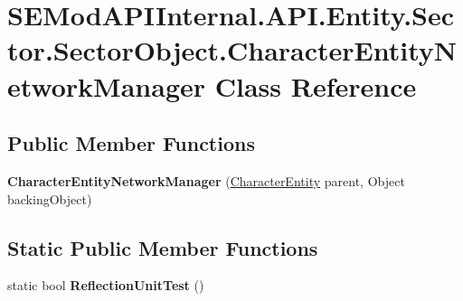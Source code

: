 \hypertarget{class_s_e_mod_a_p_i_internal_1_1_a_p_i_1_1_entity_1_1_sector_1_1_sector_object_1_1_character_entity_network_manager}{}\section{S\+E\+Mod\+A\+P\+I\+Internal.\+A\+P\+I.\+Entity.\+Sector.\+Sector\+Object.\+Character\+Entity\+Network\+Manager Class Reference}
\label{class_s_e_mod_a_p_i_internal_1_1_a_p_i_1_1_entity_1_1_sector_1_1_sector_object_1_1_character_entity_network_manager}
\subsection*{Public Member Functions}
\begin{DoxyCompactItemize}
\item 
\hypertarget{class_s_e_mod_a_p_i_internal_1_1_a_p_i_1_1_entity_1_1_sector_1_1_sector_object_1_1_character_entity_network_manager_aca87726f10c789899a7e62e7f157b1b6}{}{\bfseries Character\+Entity\+Network\+Manager} (\hyperlink{class_s_e_mod_a_p_i_internal_1_1_a_p_i_1_1_entity_1_1_sector_1_1_sector_object_1_1_character_entity}{Character\+Entity} parent, Object backing\+Object)\label{class_s_e_mod_a_p_i_internal_1_1_a_p_i_1_1_entity_1_1_sector_1_1_sector_object_1_1_character_entity_network_manager_aca87726f10c789899a7e62e7f157b1b6}

\end{DoxyCompactItemize}
\subsection*{Static Public Member Functions}
\begin{DoxyCompactItemize}
\item 
\hypertarget{class_s_e_mod_a_p_i_internal_1_1_a_p_i_1_1_entity_1_1_sector_1_1_sector_object_1_1_character_entity_network_manager_aaa68043ebbaeb18e72853cf987db302a}{}static bool {\bfseries Reflection\+Unit\+Test} ()\label{class_s_e_mod_a_p_i_internal_1_1_a_p_i_1_1_entity_1_1_sector_1_1_sector_object_1_1_character_entity_network_manager_aaa68043ebbaeb18e72853cf987db302a}

\end{DoxyCompactItemize}
